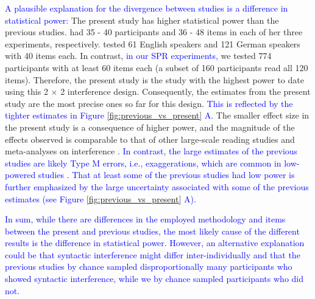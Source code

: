 \documentclass[a4paper, man, floatsintext]{apa7}
\begin{document}
\textcolor{blue}{A plausible explanation for the divergence between studies is a difference in statistical power:} The present study has higher statistical power than the previous studies. \citet{vandyke07} had 35 - 40 participants and 36 - 48 items in each of her three experiments, respectively. \textcite{mertzen} tested 61 English speakers and 121 German speakers with 40 items each. In contrast, \textcolor{blue}{in our SPR experiments,} we tested 774 participants with at least 60 items each (a subset of 160 participants read all 120 items). Therefore, the present study is the study with the highest power to date using this 2 $\times$ 2 interference design. Consequently, the estimates from the present study are the most precise ones so far for this design. \textcolor{blue}{This is reflected by the tighter estimates in Figure \ref{fig:previous_vs_present} A}. The smaller effect size in the present study is a consequence of higher power, and the magnitude of the effects observed is comparable to that of other large-scale reading studies \citep{nicenboim} and meta-analyses on interference \citep{jaeger_etal_2017}. \textcolor{blue}{In contrast, the large estimates of the previous studies are likely Type M errors, i.e., exaggerations, which are common in low-powered studies \parencite{gelman_carlin}. That at least some of the previous studies had low power is further emphasized by the large uncertainty associated with some of the previous estimates (see Figure \ref{fig:previous_vs_present} A).}

\textcolor{blue}{In sum, while there are differences in the employed methodology and items between the present and previous studies, the most likely cause of the different results is the difference in statistical power. However, an alternative explanation could be that syntactic interference might differ inter-individually \parencite{yadav2021individual} and that the previous studies by chance sampled disproportionally many participants who showed syntactic interference, while we by chance sampled participants who did not.} 
\end{document}
